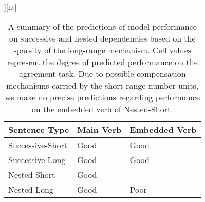 \begin{table}][ht]
\centering
\begin{tabular}{|P{3.5cm}||P{3.5cm}|P{3.5cm}|}
    \hline
    \B Sentence Type & \B Main Verb & \B Embedded Verb \\
    \hline
    Successive-Short & Good  & Good \\
    \hline
    Successive-Long & Good & Good \\
    \hline
    Nested-Short & Good & - \\
    \hline
    Nested-Long & Good & Poor \\
    \hline
\end{tabular}
\caption{A summary of the predictions of model performance on successive and nested dependencies based on the sparsity of the long-range mechanism. Cell values represent the degree of predicted performance on the agreement task. Due to possible compensation mechanisms carried by the short-range number units, we make no precise predictions regarding performance on the embedded verb of Nested-Short.}
\label{tbl:predictions}
\end{table}